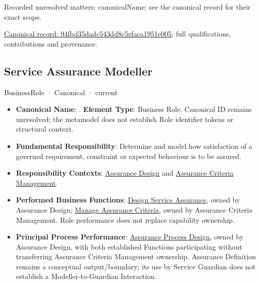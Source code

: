 {\small Recorded unresolved matters: canonicalName; see the canonical record for their exact scope.}\par
{\footnotesize \href{../../../../continuum/business/business-role/94fbd35dadc543dd8c5efaca1951e005.md}{Canonical record: 94fbd35dadc543dd8c5efaca1951e005}; full qualifications, contributions and provenance.}\par
\subsection{Service Assurance Modeller}

\label{element:962735ea17a840e5a772f813d3ad7d45}
{\small BusinessRole · Canonical · current}\par

\begin{itemize}


\item \textbf{Canonical Name}: \texttt{}. \textbf{Element Type}: Business Role. Canonical ID remains unresolved; the metamodel does not establish Role identifier tokens or structural context.

\item \textbf{Fundamental Responsibility}: Determine and model how satisfaction of a governed requirement, constraint or expected behaviour is to be assured.

\item \textbf{Responsibility Contexts}: \href{\detokenize{../../../../../docs/markdown/02-strategy/capabilities/business-enabling-capabilities.md#assurance-design}}{Assurance Design} and \href{\detokenize{../../../../../docs/markdown/02-strategy/capabilities/business-enabling-capabilities.md#assurance-criteria-management}}{Assurance Criteria Management}.

\item \textbf{Performed Business Functions}: \href{\detokenize{../../../../../docs/markdown/03-business-architecture/behaviours/health-service-assurance.md#design-service-assurance}}{Design Service Assurance}, owned by Assurance Design; \href{\detokenize{../../../../../docs/markdown/03-business-architecture/behaviours/health-service-assurance.md#manage-assurance-criteria}}{Manage Assurance Criteria}, owned by Assurance Criteria Management. Role performance does not replace capability ownership.

\item \textbf{Principal Process Performance}: \href{\detokenize{../../../../../docs/markdown/03-business-architecture/processes/business-processes.md#assurance-process-design}}{Assurance Process Design}, owned by Assurance Design, with both established Functions participating without transferring Assurance Criteria Management ownership. Assurance Definition remains a conceptual output/boundary; its use by Service Guardian does not establish a Modeller-to-Guardian Interaction.


\end{itemize}

